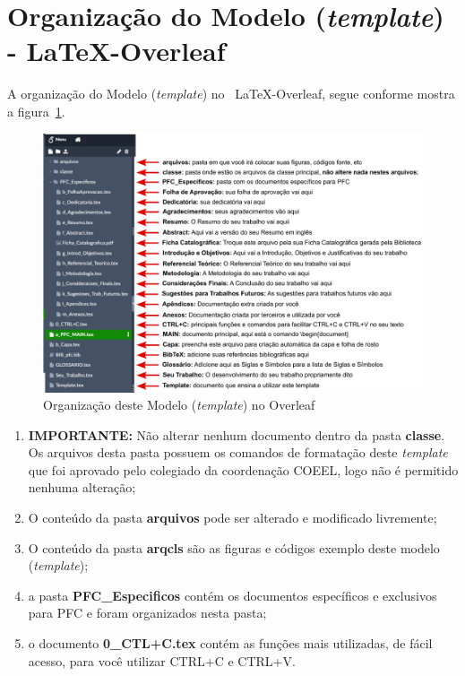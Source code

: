 \section{Organização do Modelo ({\it template}) - \LaTeX -Overleaf}

A organização do Modelo ({\it template}) no ~\LaTeX -Overleaf, segue conforme mostra a figura~\ref{fig:Organiza_Template}.

 \begin{figure}[htb]
     \centering
     \includegraphics[width=14cm]{classe/arqcls/Organiza_template.pdf}
     \caption{Organização deste Modelo ({\it template}) no Overleaf}
     \label{fig:Organiza_Template}
 \end{figure}

\begin{CaixaVermelha}
    \begin{enumerate}
        \item {\bf IMPORTANTE:}  Não alterar nenhum documento dentro da pasta {\bf classe}. Os arquivos desta pasta possuem os comandos de formatação deste {\it template} que foi aprovado pelo colegiado da coordenação COEEL, logo não é permitido nenhuma alteração;
        \item O conteúdo da pasta {\bf arquivos} pode ser alterado e modificado livremente;
        \item O conteúdo da pasta {\bf arqcls} são as figuras e códigos exemplo deste modelo ({\it template});
        \item a pasta {\bf PFC\_Especificos} contém os documentos específicos e exclusivos para PFC e foram organizados nesta pasta;
        \item o documento {\bf 0\_CTL+C.tex} contém as funções mais utilizadas, de fácil acesso, para você utilizar CTRL+C e CTRL+V.
    \end{enumerate}
\end{CaixaVermelha}
 

